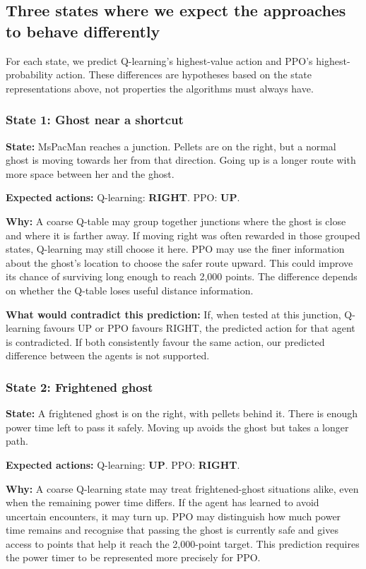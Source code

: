\subsection{Three states where we expect the approaches to behave differently}
For each state, we predict Q-learning's highest-value action and PPO's highest-probability action. These differences are hypotheses based on the state representations above, not properties the algorithms must always have.

\subsubsection{State 1: Ghost near a shortcut}
\textbf{State:} MsPacMan reaches a junction. Pellets are on the right, but a normal ghost is moving towards her from that direction. Going up is a longer route with more space between her and the ghost.

\textbf{Expected actions:} Q-learning: \textbf{RIGHT}. PPO: \textbf{UP}.

\textbf{Why:} A coarse Q-table may group together junctions where the ghost is close and where it is farther away. If moving right was often rewarded in those grouped states, Q-learning may still choose it here. PPO may use the finer information about the ghost's location to choose the safer route upward. This could improve its chance of surviving long enough to reach 2,000 points. The difference depends on whether the Q-table loses useful distance information.

\textbf{What would contradict this prediction:} If, when tested at this junction, Q-learning favours UP or PPO favours RIGHT, the predicted action for that agent is contradicted. If both consistently favour the same action, our predicted difference between the agents is not supported.

\subsubsection{State 2: Frightened ghost}
\textbf{State:} A frightened ghost is on the right, with pellets behind it. There is enough power time left to pass it safely. Moving up avoids the ghost but takes a longer path.

\textbf{Expected actions:} Q-learning: \textbf{UP}. PPO: \textbf{RIGHT}.

\textbf{Why:} A coarse Q-learning state may treat frightened-ghost situations alike, even when the remaining power time differs. If the agent has learned to avoid uncertain encounters, it may turn up. PPO may distinguish how much power time remains and recognise that passing the ghost is currently safe and gives access to points that help it reach the 2,000-point target. This prediction requires the power timer to be represented more precisely for PPO.

